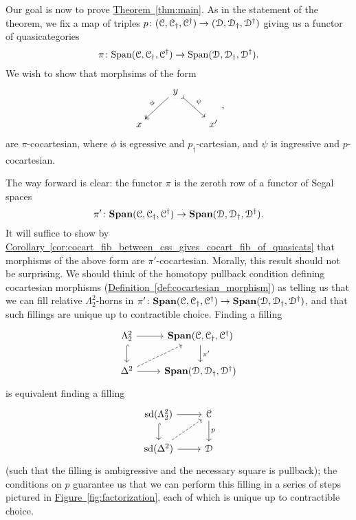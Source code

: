 \documentclass[main.tex]{subfiles}
\begin{document}
Our goal is now to prove \hyperref[thm:main]{Theorem~\ref*{thm:main}}. As in the statement of the theorem, we fix a map of triples $p\colon (\mathcal{C}, \mathcal{C}_{\dagger}, \mathcal{C}^{\dagger}) \to (\mathcal{D}, \mathcal{D}_{\dagger}, \mathcal{D}^{\dagger})$ giving us a functor of quasicategories
\begin{equation*}
  \pi\colon \mathrm{Span}(\mathcal{C}, \mathcal{C}_{\dagger}, \mathcal{C}^{\dagger}) \to \mathrm{Span}(\mathcal{D}, \mathcal{D}_{\dagger}, \mathcal{D}^{\dagger}).
\end{equation*}
We wish to show that morphsims of the form
\begin{equation}
  \label{eq:form_of_p_cocartesian_morphisms}
  \begin{tikzcd}
    & y
    \arrow[dl, two heads, swap, "\phi"]
    \arrow[dr, rightarrowtail, "\psi"]
    \\
    x
    && x'
  \end{tikzcd},
\end{equation}
are $\pi$-cocartesian, where $\phi$ is egressive and $p_{\dagger}$-cartesian, and $\psi$ is ingressive and $p$-cocartesian.

The way forward is clear: the functor $\pi$ is the zeroth row of a functor of Segal spaces
\begin{equation*}
  \pi'\colon \mathbf{Span}(\mathcal{C}, \mathcal{C}_{\dagger}, \mathcal{C}^{\dagger}) \to \mathbf{Span}(\mathcal{D}, \mathcal{D}_{\dagger}, \mathcal{D}^{\dagger}).
\end{equation*}
It will suffice to show by \hyperref[cor:cocart_fib_between_css_gives_cocart_fib_of_quasicats]{Corollary~\ref*{cor:cocart_fib_between_css_gives_cocart_fib_of_quasicats}} that morphisms of the above form are $\pi'$-cocartesian. Morally, this result should not be surprising. We should think of the homotopy pullback condition defining cocartesian morphisms (\hyperref[def:cocartesian_morphism]{Definition~\ref*{def:cocartesian_morphism}}) as telling us that we can fill relative $\Lambda^{2}_{2}$-horns in $\pi'\colon \mathbf{Span}(\mathcal{C}, \mathcal{C}_{\dagger}, \mathcal{C}^{\dagger}) \to \mathbf{Span}(\mathcal{D}, \mathcal{D}_{\dagger}, \mathcal{D}^{\dagger})$, and that such fillings are unique up to contractible choice. Finding a filling 
\begin{equation*}
  \begin{tikzcd}
    \Lambda^{2}_{2}
    \arrow[r]
    \arrow[d, hook]
    & \SPAN\triple{C}
    \arrow[d, "\pi'"]
    \\
    \Delta^{2}
    \arrow[r]
    \arrow[ur, dashed]
    & \SPAN\triple{D}
  \end{tikzcd}
\end{equation*}
is equivalent finding a filling
\begin{equation*}
  \begin{tikzcd}
    \sd(\Lambda^{2}_{2})
    \arrow[r]
    \arrow[d, hook]
    & \category{C}
    \arrow[d, "p"]
    \\
    \sd(\Delta^{2})
    \arrow[r]
    \arrow[ur, dashed]
    & \category{D}
  \end{tikzcd}
\end{equation*}
(such that the filling is ambigressive and the necessary square is pullback); the conditions on $p$ guarantee us that we can perform this filling in a series of steps pictured in \hyperref[fig:factorization]{Figure~\ref*{fig:factorization}}, each of which is unique up to contractible choice.
\end{document}
